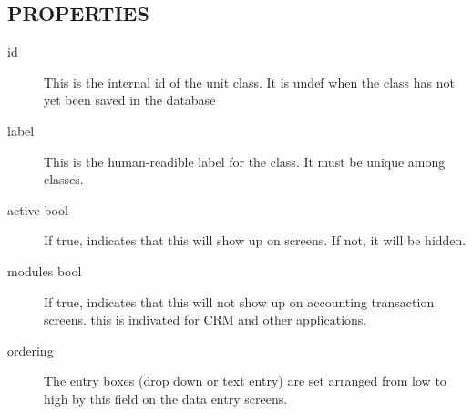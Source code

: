 \subsection*{PROPERTIES\label{LedgerSMB::DBObject::Business_Unit_Class_PROPERTIES}}
\begin{description}

\item[{id}] \mbox{}

This is the internal id of the unit class.  It is undef when the class has not
yet been saved in the database


\item[{label}] \mbox{}

This is the human-readible label for the class.  It must be unique among
classes.


\item[{active bool}] \mbox{}

If true, indicates that this will show up on screens.  If not, it will be
hidden.


\item[{modules bool}] \mbox{}

If true, indicates that this will not show up on accounting transaction screens.
this is indivated for CRM and other applications.


\item[{ordering}] \mbox{}

The entry boxes (drop down or text entry) are set arranged from low to high
by this field on the data entry screens.

\end{description}
